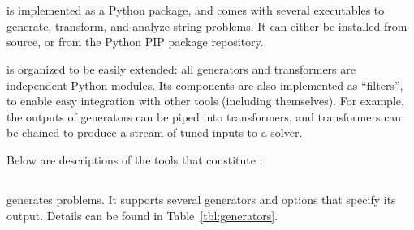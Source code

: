 \section{\fuzzer{}}
\label{sec:fuzzer}
\vspace{-0.1in}

    \fuzzer{} is implemented as a Python package, and comes with several executables to generate, transform, and analyze 
    \smtfull{} string problems. It can either be installed from source, or from the Python PIP package repository. 
    

    \fuzzer{} is organized to be easily extended: all generators and transformers are independent Python modules. 
    Its components are also implemented as \unix{} ``filters'', to enable easy integration with other tools (including themselves). 
    For example, the outputs of generators can be piped into transformers, and transformers can be chained to produce a stream of 
    tuned inputs to a solver. 
    
    Below are descriptions of the tools that constitute \fuzzer{}:


\vspace{-0.15in}
\subsection{\generator{}}

\generator{} generates \smt{} problems. It supports several generators and options that specify its output. 
Details can be found in Table~\ref{tbl:generators}.
    
    
    
